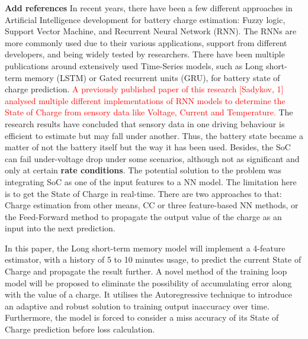 %
%
\textbf{Add references}
In recent years, there have been a few different approaches in Artificial Intelligence development for battery charge estimation: Fuzzy logic, Support Vector Machine, and Recurrent Neural Network (RNN).
The RNNs are more commonly used due to their various applications, support from different developers, and being widely tested by researchers.
There have been multiple publications around extensively used Time-Series models, such as Long short-term memory (LSTM) or Gated recurrent units (GRU), for battery state of charge prediction.
\textcolor{red}{A previously published paper of this research [Sadykov, 1] analysed multiple different implementations of RNN models to determine the State of Charge from sensory data like Voltage, Current and Temperature.}
The research results have concluded that sensory data in one driving behaviour is efficient to estimate but may fall under another.
Thus, the battery state became a matter of not the battery itself but the way it has been used.
Besides, the SoC can fail under-voltage drop under some scenarios, although not as significant and only at certain \textbf{rate conditions}.
The potential solution to the problem was integrating SoC as one of the input features to a NN model.
The limitation here is to get the State of Charge in real-time.
There are two approaches to that: Charge estimation from other means, CC or three feature-based NN methods, or the Feed-Forward method to propagate the output value of the charge as an input into the next prediction.

%
%
In this paper, the Long short-term memory model will implement a 4-feature estimator, with a history of 5 to 10 minutes usage, to predict the current State of Charge and propagate the result further.
A novel method of the training loop model will be proposed to eliminate the possibility of accumulating error along with the value of a charge.
It utilises the Autoregressive technique to introduce an adaptive and robust solution to training output inaccuracy over time.
Furthermore, the model is forced to consider a miss accuracy of its State of Charge prediction before loss calculation.

